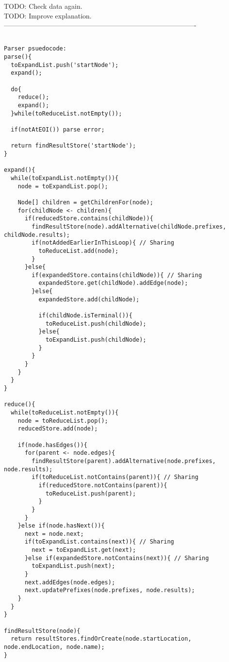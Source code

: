 \documentclass[a4paper,10pt]{article}
\begin{document}
TODO: Check data again.\\
TODO: Improve explanation.\\

-------------------------------------------------------------------------------------\\

\begin{verbatim}

Parser psuedocode:
parse(){
  toExpandList.push('startNode');
  expand();
  
  do{
    reduce();
    expand();
  }while(toReduceList.notEmpty());
  
  if(notAtEOI()) parse error;
  
  return findResultStore('startNode');
}

expand(){
  while(toExpandList.notEmpty()){
    node = toExpandList.pop();
    
    Node[] children = getChildrenFor(node);
    for(childNode <- children){
      if(reducedStore.contains(childNode)){
        findResultStore(node).addAlternative(childNode.prefixes, childNode.results);
        if(notAddedEarlierInThisLoop){ // Sharing
          toReduceList.add(node);
        }
      }else{
        if(expandedStore.contains(childNode)){ // Sharing
          expandedStore.get(childNode).addEdge(node);
        }else{
          expandedStore.add(childNode);
          
          if(childNode.isTerminal()){
            toReduceList.push(childNode);
          }else{
            toExpandList.push(childNode);
          }
        }
      }
    }
  }
}

reduce(){
  while(toReduceList.notEmpty()){
    node = toReduceList.pop();
    reducedStore.add(node);
    
    if(node.hasEdges()){
      for(parent <- node.edges){
        findResultStore(parent).addAlternative(node.prefixes, node.results);
        if(toReduceList.notContains(parent)){ // Sharing
          if(reducedStore.notContains(parent)){
            toReduceList.push(parent);
          }
        }
      }
    }else if(node.hasNext()){
      next = node.next;
      if(toExpandList.contains(next)){ // Sharing
        next = toExpandList.get(next);
      }else if(expandedStore.notContains(next)){ // Sharing
        toExpandList.push(next);
      }
      next.addEdges(node.edges);
      next.updatePrefixes(node.prefixes, node.results);
    }
  }
}

findResultStore(node){
  return resultStores.findOrCreate(node.startLocation, node.endLocation, node.name);
}

\end{verbatim}
\end{document}
